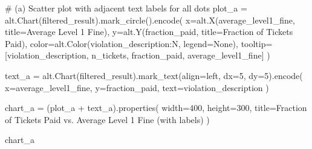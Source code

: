 \documentclass[
  letterpaper,
  DIV=11,
  numbers=noendperiod]{scrartcl}
\newenvironment{Shaded}{\begin{snugshade}}{\end{snugshade}}
\newcommand{\CommentTok}[1]{\textcolor[rgb]{0.37,0.37,0.37}{#1}}
\newcommand{\DecValTok}[1]{\textcolor[rgb]{0.68,0.00,0.00}{#1}}
\newcommand{\NormalTok}[1]{\textcolor[rgb]{0.00,0.23,0.31}{#1}}
\newcommand{\OperatorTok}[1]{\textcolor[rgb]{0.37,0.37,0.37}{#1}}
\newcommand{\StringTok}[1]{\textcolor[rgb]{0.13,0.47,0.30}{#1}}
\newcommand{\VariableTok}[1]{\textcolor[rgb]{0.07,0.07,0.07}{#1}}
\begin{document}
\begin{Shaded}
\begin{Highlighting}[]
\CommentTok{\# (a) Scatter plot with adjacent text labels for all dots}
\NormalTok{plot\_a }\OperatorTok{=}\NormalTok{ alt.Chart(filtered\_result).mark\_circle().encode(}
\NormalTok{    x}\OperatorTok{=}\NormalTok{alt.X(}\StringTok{\textquotesingle{}average\_level1\_fine\textquotesingle{}}\NormalTok{, title}\OperatorTok{=}\StringTok{\textquotesingle{}Average Level 1 Fine\textquotesingle{}}\NormalTok{),}
\NormalTok{    y}\OperatorTok{=}\NormalTok{alt.Y(}\StringTok{\textquotesingle{}fraction\_paid\textquotesingle{}}\NormalTok{, title}\OperatorTok{=}\StringTok{\textquotesingle{}Fraction of Tickets Paid\textquotesingle{}}\NormalTok{),}
\NormalTok{    color}\OperatorTok{=}\NormalTok{alt.Color(}\StringTok{\textquotesingle{}violation\_description:N\textquotesingle{}}\NormalTok{, legend}\OperatorTok{=}\VariableTok{None}\NormalTok{),}
\NormalTok{    tooltip}\OperatorTok{=}\NormalTok{[}\StringTok{\textquotesingle{}violation\_description\textquotesingle{}}\NormalTok{, }\StringTok{\textquotesingle{}n\_tickets\textquotesingle{}}\NormalTok{, }\StringTok{\textquotesingle{}fraction\_paid\textquotesingle{}}\NormalTok{, }\StringTok{\textquotesingle{}average\_level1\_fine\textquotesingle{}}\NormalTok{]}
\NormalTok{)}

\NormalTok{text\_a }\OperatorTok{=}\NormalTok{ alt.Chart(filtered\_result).mark\_text(align}\OperatorTok{=}\StringTok{\textquotesingle{}left\textquotesingle{}}\NormalTok{, dx}\OperatorTok{=}\DecValTok{5}\NormalTok{, dy}\OperatorTok{=}\DecValTok{5}\NormalTok{).encode(}
\NormalTok{    x}\OperatorTok{=}\StringTok{\textquotesingle{}average\_level1\_fine\textquotesingle{}}\NormalTok{,}
\NormalTok{    y}\OperatorTok{=}\StringTok{\textquotesingle{}fraction\_paid\textquotesingle{}}\NormalTok{,}
\NormalTok{    text}\OperatorTok{=}\StringTok{\textquotesingle{}violation\_description\textquotesingle{}}
\NormalTok{)}

\NormalTok{chart\_a }\OperatorTok{=}\NormalTok{ (plot\_a }\OperatorTok{+}\NormalTok{ text\_a).properties(}
\NormalTok{    width}\OperatorTok{=}\DecValTok{400}\NormalTok{,}
\NormalTok{    height}\OperatorTok{=}\DecValTok{300}\NormalTok{,}
\NormalTok{    title}\OperatorTok{=}\StringTok{\textquotesingle{}Fraction of Tickets Paid vs. Average Level 1 Fine (with labels)\textquotesingle{}}
\NormalTok{)}

\NormalTok{chart\_a}
\end{Highlighting}
\end{Shaded}
\end{document}
